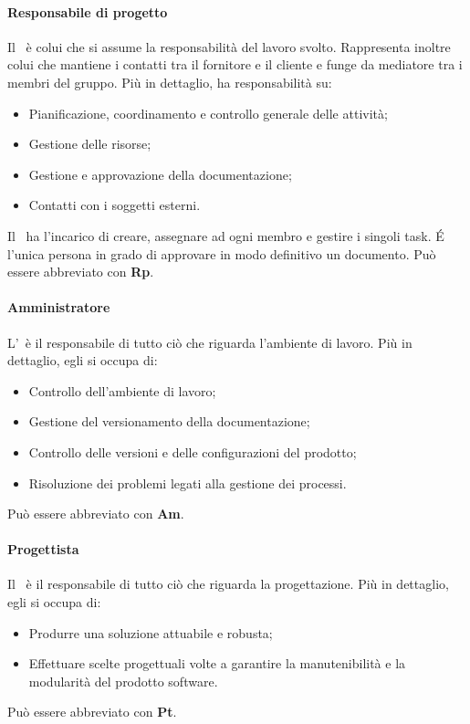 \documentclass[../NormeDiProgetto.tex]{subfiles}
\begin{document}
\paragraph{Responsabile di progetto}
Il \responsabilediprogetto\ è colui che si assume la responsabilità del
lavoro svolto. Rappresenta inoltre colui che mantiene i contatti tra il fornitore e il cliente e funge da mediatore tra i membri del gruppo. Più in dettaglio, ha responsabilità su:
\begin{itemize}
  \item Pianificazione, coordinamento e controllo generale delle attività;
  \item Gestione delle risorse;
  \item Gestione e approvazione della documentazione;
  \item Contatti con i soggetti esterni.
\end{itemize}
Il \responsabilediprogetto\ ha l'incarico di creare, assegnare ad ogni membro e gestire i singoli task. É l'unica persona in grado di approvare in modo definitivo un documento.
Può essere abbreviato con \textbf{Rp}.

\paragraph{Amministratore}
L'\amministratore\ è il responsabile di tutto ciò che riguarda l'ambiente di lavoro. Più in dettaglio, egli si occupa di:
\begin{itemize}
  \item Controllo dell'ambiente di lavoro;
  \item Gestione del versionamento della documentazione;
  \item Controllo delle versioni e delle configurazioni del prodotto;
  \item Risoluzione dei problemi legati alla gestione dei processi.
\end{itemize}
Può essere abbreviato con \textbf{Am}.

\paragraph{Progettista}
Il \progettista\ è il responsabile di tutto ciò che riguarda la progettazione.
Più in dettaglio, egli si occupa di:
\begin{itemize}
  \item Produrre una soluzione attuabile e robusta;
  \item Effettuare scelte progettuali volte a garantire la manutenibilità e la modularità del prodotto software.
\end{itemize}
Può essere abbreviato con \textbf{Pt}.
\end{document}
